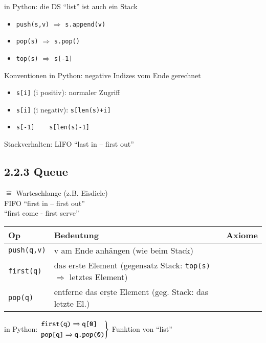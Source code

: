     in Python: die DS ``list'' ist auch ein Stack
    \begin{itemize}
        \item \verb|push(s,v)| $\Rightarrow$ \verb|s.append(v)|
        \item \verb|pop(s)| $\Rightarrow$ \verb|s.pop()|
        \item \verb|top(s)| $\Rightarrow$ \verb|s[-1]|
    \end{itemize}
    Konventionen in Python: negative Indizes vom Ende gerechnet
    \begin{itemize}[label={}]
        \item \verb|s[i]| (i positiv): normaler Zugriff
        \item \verb|s[i]| (i negativ): \verb|s[len(s)+i]|
        \item \verb|s[-1]    s[len(s)-1]|
    \end{itemize}

    Stackverhalten: LIFO ``last in – first out''

    \subsection*{2.2.3 Queue}
    $\widehat{=}$ Warteschlange (z.B. Eisdiele) \\

    FIFO ``first in – first out'' \\
    ``first come - first serve'' \\

    \begin{tabular}{C{5cm} C{5cm} C{5cm}}
        Op & Bedeutung & Axiome \\ \hline
        \verb|push(q,v)| & v am Ende anhängen (wie beim Stack) & \\
        \verb|first(q)| & das erste Element (gegensatz Stack: \verb|top(s)| $\Rightarrow$ letztes Element) & \\
        \verb|pop(q)| & entferne das $\underline{\text{erste}}$ Element (geg. Stack: das letzte El.) & \\ \hline
    \end{tabular}

    in Python:
    $\begin{rcases}
        \verb|first(q)| \Rightarrow \verb|q[0]| \\
        \verb|pop[q]| \Rightarrow \verb|q.pop(0)|
        \end{rcases}$
        Funktion von ``list'' \\

